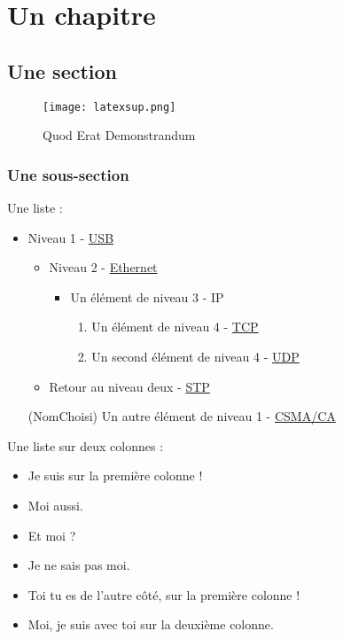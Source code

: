 \chapter{Un chapitre}
\section{Une section}

\begin{figure}[H]
    \centering
    \texttt{[image: latexsup.png]}
    \caption{Quod Erat Demonstrandum}
\end{figure}

\FloatBarrier

\clearpage

\subsection{Une sous-section}

Une liste :
\begin{itemize} %
    \item Niveau 1 - \href{https://fr.wikipedia.org/wiki/USB}{USB}
    \begin{itemize}
        \item Niveau 2 - \href{https://fr.wikipedia.org/wiki/Ethernet}{Ethernet}
        \begin{itemize}
            \item Un élément de niveau 3 - IP
            \begin{enumerate} %
                \item Un élément de niveau 4 - \href{https://en.wikipedia.org/wiki/TCP}{TCP}
                \item Un second élément de niveau 4 - \href{https://en.wikipedia.org/wiki/UDP}{UDP}
            \end{enumerate}
        \end{itemize}
        \item Retour au niveau deux - \href{https://fr.wikipedia.org/wiki/Spanning_Tree_Protocol}{STP}
    \end{itemize}
    \item[(NomChoisi)] Un autre élément de niveau 1 - \href{https://fr.wikipedia.org/wiki/Carrier_Sense_Multiple_Access_with_Collision_Avoidance}{CSMA/CA}
\end{itemize}

Une liste sur deux colonnes :
\begin{itemize}[twocol]
    \item Je suis sur la première colonne !
    \item Moi aussi.
    \item Et moi ?
    \item Je ne sais pas moi.
    \item Toi tu es de l'autre côté, sur la première colonne !
    \item Moi, je suis avec toi sur la deuxième colonne.
\end{itemize}


